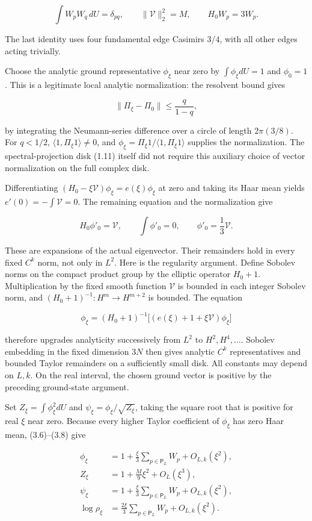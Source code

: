 \[
\int W_pW_q\,dU=\delta_{pq},\qquad
\|\mathcal V\|_2^2=M,\qquad H_0W_p=3W_p.
\tag{3.6}
\]

The last identity uses four fundamental edge Casimirs \(3/4\), with all
other edges acting trivially.

Choose the analytic ground representative \(\phi_\xi\) near zero by
\(\int\phi_\xi dU=1\) and \(\phi_0=1\). This is a legitimate local
analytic normalization: the resolvent bound gives

\[
\|\Pi_\xi-\Pi_0\|\leq\frac{q}{1-q},
\tag{3.7}
\]

by integrating the Neumann-series difference over a circle of length
\(2\pi(3/8)\). For \(q<1/2\), \(\langle1,\Pi_\xi1\rangle\ne0\), and
\(\phi_\xi=\Pi_\xi1/\langle1,\Pi_\xi1\rangle\) supplies the
normalization. The spectral-projection disk (1.11) itself did not
require this auxiliary choice of vector normalization on the full
complex disk.

Differentiating \((H_0-\xi\mathcal V)\phi_\xi=e(\xi)\phi_\xi\) at zero
and taking its Haar mean yields \(e'(0)=-\int\mathcal V=0\). The
remaining equation and the normalization give

\[
H_0\phi'_0=\mathcal V,\qquad \int\phi'_0=0,
\qquad \phi'_0=\frac13\mathcal V.
\tag{3.8}
\]

These are expansions of the actual eigenvector. Their remainders hold in
every fixed \(C^k\) norm, not only in \(L^2\). Here is the regularity
argument. Define Sobolev norms on the compact product group by the
elliptic operator \(H_0+1\). Multiplication by the fixed smooth function
\(\mathcal V\) is bounded in each integer Sobolev norm, and
\((H_0+1)^{-1}:H^m\to H^{m+2}\) is bounded. The equation

\[
\phi_\xi=(H_0+1)^{-1}\big[(e(\xi)+1+\xi\mathcal V)\phi_\xi\big]
\]

therefore upgrades analyticity successively from \(L^2\) to
\(H^2,H^4,\ldots\). Sobolev embedding in the fixed dimension \(3N\) then
gives analytic \(C^k\) representatives and bounded Taylor remainders on
a sufficiently small disk. All constants may depend on \(L,k\). On the
real interval, the chosen ground vector is positive by the preceding
ground-state argument.

Set \(Z_\xi=\int\phi_\xi^2dU\) and \(\psi_\xi=\phi_\xi/\sqrt{Z_\xi}\),
taking the square root that is positive for real \(\xi\) near zero.
Because every higher Taylor coefficient of \(\phi_\xi\) has zero Haar
mean, (3.6)--(3.8) give

\[
\begin{split}
\phi_\xi&=1+\frac\xi3\sum_{p\in\mathsf P_L}W_p+O_{L,k}(\xi^2),\\
Z_\xi&=1+\frac M9\xi^2+O_L(\xi^3),\\
\psi_\xi&=1+\frac\xi3\sum_{p\in\mathsf P_L}W_p+O_{L,k}(\xi^2),\\
\log\rho_\xi&=\frac{2\xi}{3}\sum_{p\in\mathsf P_L}W_p+O_{L,k}(\xi^2).
\end{split}
\tag{3.9}
\]

